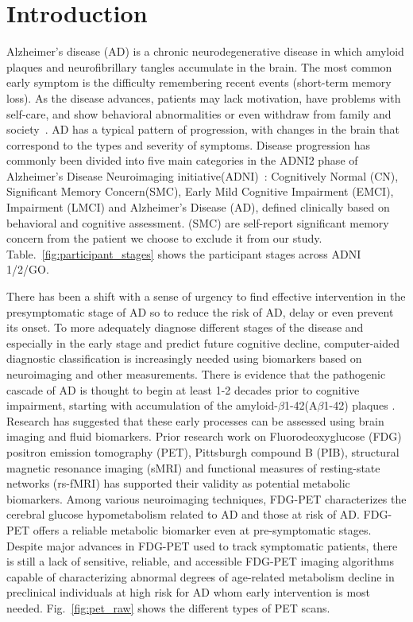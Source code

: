 \chapter{Introduction}

Alzheimer’s disease (AD) is a chronic neurodegenerative disease in which amyloid plaques and neurofibrillary tangles accumulate in the brain. The most common early symptom is the difficulty remembering recent events (short-term memory loss). As the disease advances, patients may lack motivation, have problems with self-care, and show behavioral abnormalities or even withdraw from family and society~\citep{Burns:2009}. AD has a typical pattern of progression, with changes in the brain that correspond to the types and severity of symptoms. Disease progression has commonly been divided into five main categories in the ADNI2 phase of Alzheimer's Disease Neuroimaging initiative(ADNI)~\citep{weiner2013alzheimer}: Cognitively Normal (CN), Significant Memory Concern(SMC), Early Mild Cognitive Impairment (EMCI), Impairment (LMCI) and Alzheimer's Disease (AD), defined clinically based on behavioral and cognitive assessment. (SMC) are self-report significant memory concern from the patient we choose to exclude it from our study. Table.~\ref{fig:participant_stages} shows the participant stages across ADNI 1/2/GO.

There has been a shift with a sense of urgency to find effective intervention in the presymptomatic stage of AD so to reduce the risk of AD, delay or even prevent its onset. To more adequately diagnose different stages of the disease and especially in the early stage and predict future cognitive decline, computer-aided diagnostic classification is increasingly needed using biomarkers based on neuroimaging and other measurements.
There is evidence that the pathogenic cascade of AD is thought to begin at least 1-2 decades prior to cognitive impairment, starting with accumulation of the amyloid-$\beta$1-42(A$\beta$1-42) plaques \citep{langbaum2013ushering}. Research has suggested that these early processes can be assessed using brain imaging and fluid biomarkers. Prior research work on Fluorodeoxyglucose (FDG) positron emission tomography (PET), Pittsburgh compound B (PIB), structural magnetic resonance imaging (sMRI) and functional measures of resting-state networks (rs-fMRI) has supported their validity as potential metabolic biomarkers. Among various neuroimaging techniques, FDG-PET characterizes the cerebral glucose hypometabolism related to AD and those at risk of AD. FDG-PET offers a reliable metabolic biomarker even at pre-symptomatic stages. Despite major advances in FDG-PET used to track symptomatic patients, there is still a lack of sensitive, reliable, and accessible FDG-PET imaging algorithms capable of characterizing abnormal degrees of age-related metabolism decline in preclinical individuals at high risk for AD whom early intervention is most needed. Fig.~\ref{fig:pet_raw} shows the different types of PET scans.

